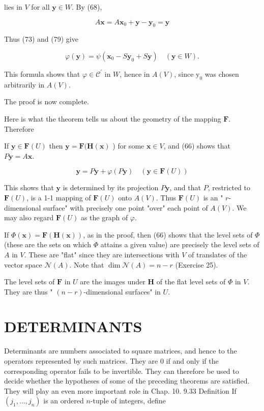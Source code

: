 \documentclass[10pt]{article}
\begin{document}
lies in $V$ for all $\mathbf{y} \in W$. By (68),

$$
A \mathbf{x}=A \mathbf{x}_{0}+\mathbf{y}-\mathbf{y}_{0}=\mathbf{y}
$$

Thus (73) and (79) give

$$
\varphi(\mathbf{y})=\psi\left(\mathbf{x}_{0}-S \mathbf{y}_{0}+S \mathbf{y}\right) \quad(\mathbf{y} \in W) .
$$

This formula shows that $\varphi \in \mathscr{C}^{\prime}$ in $W$, hence in $A(V)$, since $\mathrm{y}_{0}$ was chosen arbitrarily in $A(V)$.

The proof is now complete.

Here is what the theorem tells us about the geometry of the mapping $\mathbf{F}$. Therefore

If $\mathbf{y} \in \mathbf{F}(U)$ then $\mathbf{y}=\mathbf{F}(\mathbf{H}(\mathbf{x})$ ) for some $\mathbf{x} \in V$, and (66) shows that $P \mathbf{y}=A \mathbf{x}$.

$$
\mathbf{y}=P \mathbf{y}+\varphi(P \mathbf{y}) \quad(\mathbf{y} \in \mathbf{F}(U))
$$

This shows that $\mathbf{y}$ is determined by its projection $P \mathbf{y}$, and that $P$, restricted to $\mathbf{F}(U)$, is a 1-1 mapping of $\mathbf{F}(U)$ onto $A(V)$. Thus $\mathbf{F}(U)$ is an " $r$-dimensional surface" with precisely one point "over" each point of $A(V)$. We may also regard $\mathbf{F}(U)$ as the graph of $\varphi$.

If $\Phi(\mathbf{x})=\mathbf{F}(\mathbf{H}(\mathbf{x}))$, as in the proof, then (66) shows that the level sets of $\Phi$ (these are the sets on which $\Phi$ attains a given value) are precisely the level sets of $A$ in $V$. These are "flat" since they are intersections with $V$ of translates of the vector space $\mathscr{N}(A)$. Note that $\operatorname{dim} \mathscr{N}(A)=n-r$ (Exercise 25).

The level sets of $\mathbf{F}$ in $U$ are the images under $\mathbf{H}$ of the flat level sets of $\Phi$ in $V$. They are thus " $(n-r)$-dimensional surfaces" in $U$.

\section{DETERMINANTS}
Determinants are numbers associated to square matrices, and hence to the operators represented by such matrices. They are 0 if and only if the corresponding operator fails to be invertible. They can therefore be used to decide whether the hypotheses of some of the preceding theorems are satisfied. They will play an even more important role in Chap. 10. 9.33 Definition If $\left(j_{1}, \ldots, j_{n}\right)$ is an ordered $n$-tuple of integers, define
\end{document}
